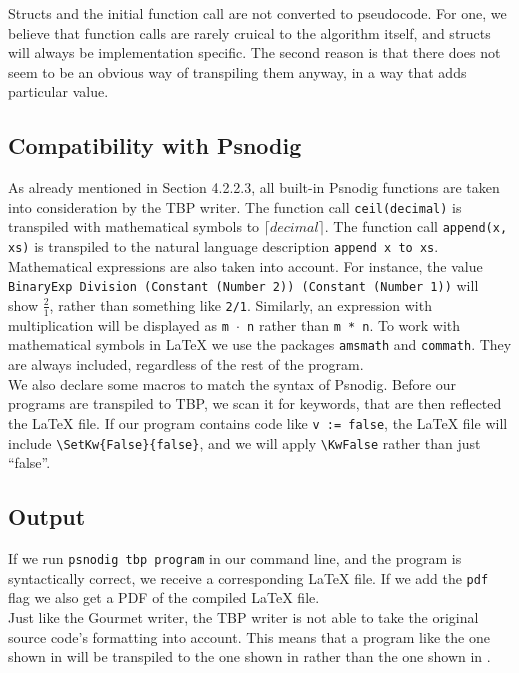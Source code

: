 Structs and the initial function call are not converted to pseudocode. For one, we believe that function calls are rarely cruical to the algorithm itself, and structs will always be implementation specific. The second reason is that there does not seem to be an obvious way of transpiling them anyway, in a way that adds particular value.

\subsection{Compatibility with Psnodig}

As already mentioned in Section 4.2.2.3, all built-in Psnodig functions are taken into consideration by the TBP writer. The function call \texttt{ceil(decimal)} is transpiled with mathematical symbols to $\lceil decimal \rceil$. The function call \texttt{append(x, xs)} is transpiled to the natural language description \texttt{append x to xs}. \\

Mathematical expressions are also taken into account. For instance, the value \texttt{BinaryExp Division (Constant (Number 2)) (Constant (Number 1))} will show $\frac{2}{1}$, rather than something like \texttt{2/1}. Similarly, an expression with multiplication will be displayed as \texttt{m $\cdot$ n} rather than \texttt{m * n}. To work with mathematical symbols in LaTeX we use the packages \texttt{amsmath} and \texttt{commath}. They are always included, regardless of the rest of the program. \\

We also declare some macros to match the syntax of Psnodig. Before our programs are transpiled to TBP, we scan it for keywords, that are then reflected the LaTeX file. If our program contains code like \texttt{v := false}, the LaTeX file will include \texttt{\textbackslash SetKw\{False\}\{false\}}, and we will apply \texttt{\textbackslash KwFalse} rather than just ``false''.

\subsection{Output}

If we run \texttt{psnodig tbp program} in our command line, and the program is syntactically correct, we receive a corresponding LaTeX file. If we add the \texttt{pdf} flag we also get a PDF of the compiled LaTeX file. \\

Just like the Gourmet writer, the TBP writer is not able to take the original source code's formatting into account. This means that a program like the one shown in  will be transpiled to the one shown in  rather than the one shown in . \\

